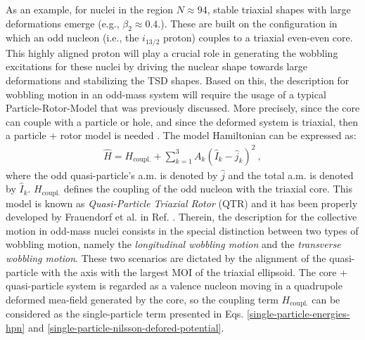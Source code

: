 As an example, for nuclei in the region $N\approx 94$, stable triaxial shapes with large deformations emerge (e.g., $\beta_2\approx0.4$.). These are built on the configuration in which an odd nucleon (i.e., the $i_{13/2}$ proton) couples to a triaxial even-even core. This highly aligned proton will play a crucial role in generating the wobbling excitations for these nuclei by driving the nuclear shape towards large deformations and stabilizing the TSD shapes. Based on this, the description for wobbling motion in an odd-mass system will require the usage of a typical Particle-Rotor-Model that was previously discussed. More precisely, since the core can couple with a particle or hole, and since the deformed system is triaxial, then a particle + rotor model is needed \cite{frauendorf2014transverse}. The model Hamiltonian can be expressed as:
\begin{align}
    \hat{H}=H_\text{coupl.}+\sum_{k=1}^{3}A_k(\hat{I}_k-\hat{j}_k)^2\ ,
    \label{oddA-QTR-general-hamiltonian}
\end{align}
where the odd quasi-particle's a.m. is denoted by $\hat{j}$ and the total a.m. is denoted by $\hat{I}_k$. $H_\text{coupl.}$ defines the coupling of the odd nucleon with the triaxial core. This model is known as \emph{Quasi-Particle Triaxial Rotor} (QTR) and it has been properly developed by Frauendorf et al. in Ref. \cite{frauendorf2014transverse}. Therein, the description for the collective motion in odd-mass nuclei consists in the special distinction between two types of wobbling motion, namely the \emph{longitudinal wobbling motion} and the \emph{transverse wobbling motion}. These two scenarios are dictated by the alignment of the quasi-particle with the axis with the largest MOI of the triaxial ellipsoid. The core + quasi-particle system is regarded as a valence nucleon moving in a quadrupole deformed mea-field generated by the core, so the coupling term $H_\text{coupl.}$ can be considered as the single-particle term presented in Eqs. \ref{single-particle-energies-hpn} and \ref{single-particle-nilsson-defored-potential}.

